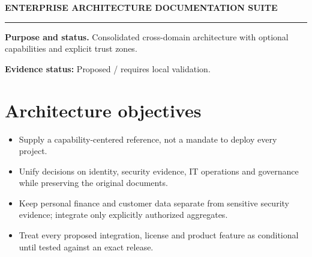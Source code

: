 \documentclass[10pt,letterpaper]{article}
\begin{document}
\begin{center}
{\large\bfseries\color{teal} ENTERPRISE ARCHITECTURE DOCUMENTATION SUITE}\par
{}\par
{}\par
\end{center}
\vspace{8pt}\hrule\vspace{12pt}
\textbf{Purpose and status.} Consolidated cross-domain architecture with optional capabilities and explicit trust zones.\par
\textbf{Evidence status:} Proposed / requires local validation.\par
\section{Architecture objectives}
\begin{itemize}
\item Supply a capability-centered reference, not a mandate to deploy every project.
\item Unify decisions on identity, security evidence, IT operations and governance while preserving the original documents.
\item Keep personal finance and customer data separate from sensitive security evidence; integrate only explicitly authorized aggregates.
\item Treat every proposed integration, license and product feature as conditional until tested against an exact release.
\end{itemize}
\end{document}
